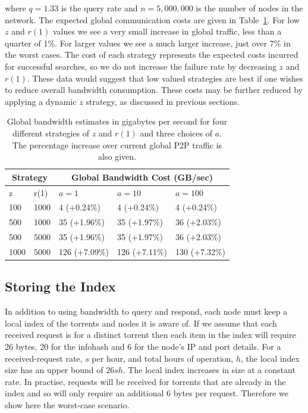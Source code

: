     where $q=1.33$ is the query rate and $n=5,000,000$ is the number of nodes in the network. The expected global communication costs are given in Table~\ref{tab:global_bandwidth}. For low $z$ and $r(1)$ values we see a very small increase in global traffic, less than a quarter of 1\%. For larger values we see a much larger increase, just over 7\% in the worst cases. The cost of each strategy represents the expected costs incurred for successful searches, so we do not increase the failure rate by decreasing $z$ and $r(1)$. These data would suggest that low valued strategies are best if one wishes to reduce overall bandwidth consumption. These costs may be further reduced by applying a dynamic $z$ strategy, as discussed in previous sections.

    \begin{table}
        \renewcommand{\arraystretch}{1.3}
        \caption{Global bandwidth estimates in gigabytes per second for four different strategies of $z$ and $r(1)$ and three choices of $a$. The percentage increase over current global P2P traffic is also given.}
        \label{tab:global_bandwidth}
        \centering
        \begin{tabular}{l|l|l|l|l}
            \hline
            \multicolumn{2}{c|}{Strategy} &           \multicolumn{3}{|c}{Global Bandwidth Cost (GB/sec)} \\ \hline
            z &                       r(1) &         $a=1$ &        $a=10$ &      $a=100$  \\ \hline
          100 &                       1000 &   4 (+0.24\%) &   4 (+0.24\%) &   4 (+0.24\%) \\
          500 &                       1000 &  35 (+1.96\%) &  35 (+1.97\%) &  36 (+2.03\%) \\
          500 &                       5000 &  35 (+1.96\%) &  35 (+1.97\%) &  36 (+2.03\%) \\
         1000 &                       5000 & 126 (+7.09\%) & 126 (+7.11\%) & 130 (+7.32\%) \\
            \hline
        \end{tabular}
    \end{table}

\subsection{Storing the Index}

    In addition to using bandwidth to query and respond, each node must keep a local index of the torrents and nodes it is aware of. If we assume that each received request is for a distinct torrent then each item in the index will require 26 bytes, 20 for the infohash and 6 for the node's IP and port details. For a received-request rate, $s$ per hour, and total hours of operation, $h$, the local index size has an upper bound of $26sh$. The local index increases in size at a constant rate. In practise, requests will be received for torrents that are already in the index and so will only require an additional 6 bytes per request. Therefore we show here the worst-case scenario.

